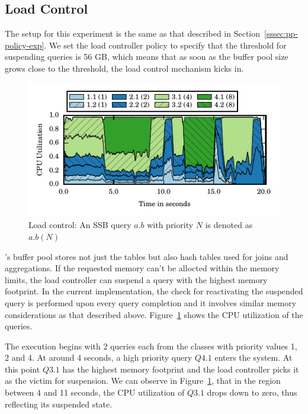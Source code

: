 \subsection{Load Control}
The setup for this experiment is the same as that described in Section~\ref{sssec:pp-policy-exp}.
We set the load controller policy to specify that the threshold for suspending queries is 56 GB, which means that as soon as the buffer pool size grows close to the threshold, the load control mechanism kicks in.

\begin{figure}[t]
	\centering
	\includegraphics[width=\columnwidth]{figures/load-control-cpu-util.pdf}
	\caption{Load control: An SSB query $a.b$ with priority $N$ is denoted as $a.b (N)$}
	\label{fig:load-control-cpu-util}
\end{figure}

\sys{}'s buffer pool stores not just the tables but also hash tables used for joins and aggregations.
If the requested memory can't be allocted within the memory limits, the load controller 
can suspend a query with the highest memory footprint. 
In the current implementation, the check for reactivating the suspended query is performed upon every query completion and it involves similar memory considerations as that described above. 
Figure~\ref{fig:load-control-cpu-util} shows the CPU utilization of the queries.

The execution begins with 2 queries each from the classes with priority values 1, 2 and 4.
At around 4 seconds, a high priority query $Q4.1$ enters the system.
At this point $Q3.1$ has the highest memory footprint and the load controller
picks it as the victim for suspension.
We can observe in Figure~\ref{fig:load-control-cpu-util}, that in the region between 4
and 11 seconds, the CPU utilization of $Q3.1$ drops down to zero, thus
reflecting its suspended state.

